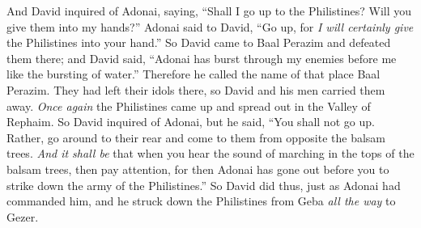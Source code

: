 \begin{biblechapter}
\verse And David inquired of Adonai, saying, “Shall I go up to the Philistines? Will you give them into my hands?” Adonai said to David, “Go up, for \textit{I will certainly give} the Philistines into your hand.”
\verse So David came to Baal Perazim and defeated them there; and David said, “Adonai has burst through my enemies before me like the bursting of water.” Therefore he called the name of that place Baal Perazim.
\verse They had left their idols there, so David and his men carried them away.
\verse \textit{Once again} the Philistines came up and spread out in the Valley of Rephaim.
\verse So David inquired of Adonai, but he said, “You shall not go up. Rather, go around to their rear and come to them from opposite the balsam trees.
\verse \textit{And it shall be} that when you hear the sound of marching in the tops of the balsam trees, then pay attention, for then Adonai has gone out before you to strike down the army of the Philistines.”
\verse So David did thus, just as Adonai had commanded him, and he struck down the Philistines from Geba \textit{all the way} to Gezer.
\end{biblechapter}

